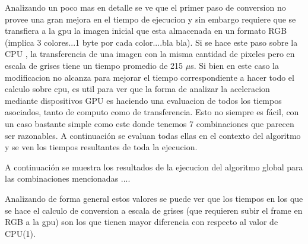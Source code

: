 \documentclass[a4paper,10pt]{report}
\begin{document}
Analizando un poco mas en detalle se ve que el primer paso de conversion no provee una gran mejora en el tiempo de ejecucion y sin embargo requiere que se transfiera a la gpu la imagen inicial
que esta almacenada en un formato RGB (implica 3 colores...1 byte por cada color....bla bla). Si se hace este paso sobre la CPU , la transferencia de una imagen con la misma cantidad de pixeles pero en escala de grises
tiene un tiempo promedio de 215 $\mu$s. Si bien en este caso la modificacion no alcanza para mejorar el tiempo correspondiente a hacer todo el calculo sobre cpu, 
es util para ver que la forma de analizar la aceleracion mediante dispositivos GPU es haciendo una evaluacion de todos los tiempos asociados, tanto de computo como de transferencia.
Esto no siempre es fácil, con un caso bastante simple como este donde tenemos 7 combinaciones que parecen ser razonables. A continuación se evaluan todas ellas en el contexto del algoritmo y
se ven los tiempos resultantes de toda la ejecucion.




A continuación se muestra los resultados de la ejecucion del algoritmo global para las combinaciones mencionadas ....

\begin{center}
\end{center}





Analizando de forma general estos valores se puede ver que los tiempos en los que se hace el calculo de conversion a escala de grises (que requieren subir el frame en RGB a la gpu) son los que tienen mayor
diferencia con respecto al valor de CPU(1).
\end{document}
